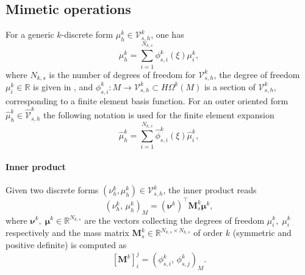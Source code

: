 \documentclass{elsarticle}
\newcommand{\revTwo}[1]{{\color{black}#1}}
\newcommand{\bbR}{\mathbb{R}}
\newcommand*{\dual}[1]{\ensuremath{\widehat{#1}}}
\newcommand{\inpr}[3][]{\ensuremath{( #2, \, #3 )_{#1}}}
\begin{document}
\subsection{Mimetic operations}
For a generic $k$-discrete form $\mu_{h}^k \in \mathcal{V}_{s, h}^k$, one has 
\begin{equation}\label{eq:trimmed_basis}
    \mu_{h}^k = \sum_{i=1}^{N_{k, s}} \phi_{s, i}^{k}(\xi) \mu_i^k, 
\end{equation}
where $N_{k, s}$ is the number of degrees of freedom for $\mathcal{V}_{s, h}^k$, the degree of freedom $\mu_i^k \in \bbR$ is given \revTwo{in \cite[Eq. 5.2]{arnold2006acta},} and $\phi_{s, i}^{k} : M \rightarrow  \mathcal{V}_{s, h}^k \subset H\Omega^k(M)$ is a section of $\mathcal{V}_{s, h}^k$, corresponding to a finite element basis function. \revTwo{For an outer oriented form $\dual{\mu}_{h}^k \in \dual{\mathcal{V}}_{s, h}^k$ the following notation is used for the finite element expansion
\begin{equation}\label{eq:trimmed_basis_hat}
    \dual{\mu}_{h}^k = \sum_{i=1}^{N_{k, s}} \dual{\phi}_{s, i}^{k}(\xi) \dual{\mu}_i^k, 
\end{equation}
}

\paragraph{Inner product}
Given two discrete forms $(\nu_h^k, \mu_h^k) \in \mathcal{V}_{s, h}^k$, the inner product reads
\begin{equation}\label{eq:alg_inner}
    \inpr[M]{\nu_h^k}{\mu_h^k} = (\bm{\nu}^k)^\top \mathbf{M}^k_s \bm{\mu}^k,
\end{equation}
where $\bm{\nu}^k, \; \bm{\mu}^k \in \bbR^{N_{k, s}}$ are the vectors collecting the degrees of freedom $\mu_i^k, \; \mu_i^k$ respectively and the mass matrix $\mathbf{M}^k_s \in \mathbb{R}^{N_{k, s}\times N_{k, s}}$ of order $k$ (symmetric and positive definite) is computed as  
$$[\mathbf{M}^k]_{i}^j = \inpr[M]{\phi_{s, i}^{k}}{\phi_{s, j}^{k}}.$$
\end{document}
